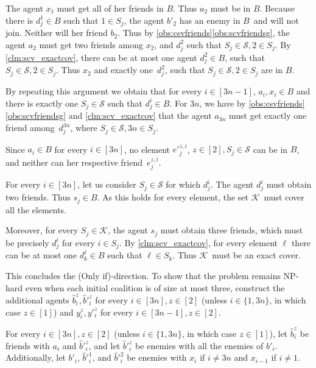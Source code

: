 \documentclass[a4paper,fleqn]{cas-sc}
\newcommand{\blockingCoalition}{\ensuremath{B}\xspace}
\newcommand{\sets}{\ensuremath{\mathcal{S}}}
\newcommand{\elements}{\ensuremath{[3n]}}
\newcommand{\sset}[1]{\ensuremath{S_{#1}}}
\newcommand{\ecov}{\ensuremath{\mathcal{K}}}
\begin{document}
{The agent $x_1$ must get all of her friends in \blockingCoalition. Thus $a_2$ must be in \blockingCoalition.
Because there is $d^1_j \in \blockingCoalition$ such that $1 \in \sset j$, the agent $b'_2$ has an enemy in \blockingCoalition\ and will not join. Neither will her friend $b_2$.
Thus by \cref{obs:csvfriends}\eqref{obs:scvfriendsg}, the agent $a_2$ must get two friends among $x_2$, and $d^2_j$ such that $\sset j \in \sets, 2 \in \sset j$.
By \cref{clm:scv_exactcov}, there can be at most one agent $d^2_j \in \blockingCoalition$, such that $\sset j \in \sets, 2 \in \sset j$.
Thus $x_2$ and exactly one~$d^2_j$, such that $\sset j \in \sets, 2 \in \sset j$ are in \blockingCoalition.

By repeating this argument we obtain that for every $i \in  [3n - 1]$, $a_i, x_i \in \blockingCoalition$ and there is exactly one $\sset j \in \sets$ such that $d^i_j \in \blockingCoalition$.
For $3n$, we have by \cref{obs:csvfriends}\eqref{obs:scvfriendsg} and \cref{clm:scv_exactcov} that the agent $a_{3n}$ must get exactly one friend among~$d^{3n}_j$, where $\sset j \in \sets, 3n \in \sset j$.

Since $a_i \in \blockingCoalition$ for every $i \in \elements$, no element  $e'^{z,i}_j$, $z \in [2], \sset j \in \sets$ can be in \blockingCoalition, and neither can her respective friend~$e^{z,i}_j$.

For every $i \in \elements$, let us consider $\sset j \in \sets$ for which $d^i_j$.
The agent $d^i_j$ must obtain two friends.
Thus $s_j \in \blockingCoalition$.
As this holds for every element, the set \ecov\ must cover all the elements.

Moreover, for every $\sset j \in \ecov$, the agent $s_j$ must obtain three friends, which must be precisely $d^i_j$ for every $i \in \sset j$. 
By \cref{clm:scv_exactcov}, for every element $\ell$ there can be at most one $d^\ell_k \in \blockingCoalition$ such that $\ell \in \sset k$.
Thus \ecov\ must be an exact cover.


This concludes the (Only if)-direction.
To show that the problem remains NP-hard even when each initial coalition is of size at most three, construct the additional agents $\hat{b}^z_i, \hat{b}'^z_i$ for every $i \in \elements, z \in [2]$ (unless $i \in \{1, 3n\}$, in which case $z \in [1]$) and $y^z_i, y'^z_i$ for every $i \in [3n - 1], z \in [2]$.

For every $i \in \elements, z \in [2]$ (unless $i \in \{1, 3n\}$, in which case $z \in [1]$), let $\hat{b}^z_i$ be friends with $a_i$ and $\hat{b}'^z_i$, and let $\hat{b}'^z_i$ be enemies with all the enemies of $b'_i$. Additionally, let $b'_i$, $\hat{b}'^1_i$, and $\hat{b}'^2_i$ be enemies with $x_i$ if $i \neq 3n$ and $x_{i - 1}$ if $i \neq 1$.

}
\end{document}
